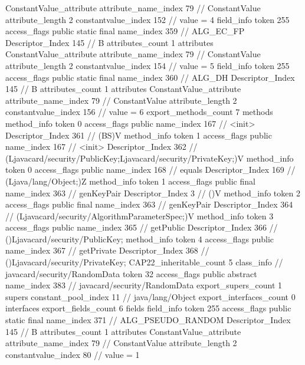 {{{{{{				ConstantValue_attribute {
					attribute_name_index	79		// ConstantValue
					attribute_length	2
					constantvalue_index	152		// value = 4
				}
				}
			}
			field_info {
				token	255
				access_flags	public static final
				name_index	359		// ALG_EC_FP
				Descriptor_Index	145		// B
				attributes_count	1
				attributes {
				ConstantValue_attribute {
					attribute_name_index	79		// ConstantValue
					attribute_length	2
					constantvalue_index	154		// value = 5
				}
				}
			}
			field_info {
				token	255
				access_flags	public static final
				name_index	360		// ALG_DH
				Descriptor_Index	145		// B
				attributes_count	1
				attributes {
				ConstantValue_attribute {
					attribute_name_index	79		// ConstantValue
					attribute_length	2
					constantvalue_index	156		// value = 6
				}
				}
			}
			}
			export_methods_count	7
			methods {
				method_info {
					token	0
					access_flags	public
					name_index	167		// <init>
					Descriptor_Index	361		// (BS)V
				}
				method_info {
					token	1
					access_flags	public
					name_index	167		// <init>
					Descriptor_Index	362		// (Ljavacard/security/PublicKey;Ljavacard/security/PrivateKey;)V
				}
				method_info {
					token	0
					access_flags	public
					name_index	168		// equals
					Descriptor_Index	169		// (Ljava/lang/Object;)Z
				}
				method_info {
					token	1
					access_flags	public final
					name_index	363		// genKeyPair
					Descriptor_Index	3		// ()V
				}
				method_info {
					token	2
					access_flags	public final
					name_index	363		// genKeyPair
					Descriptor_Index	364		// (Ljavacard/security/AlgorithmParameterSpec;)V
				}
				method_info {
					token	3
					access_flags	public
					name_index	365		// getPublic
					Descriptor_Index	366		// ()Ljavacard/security/PublicKey;
				}
				method_info {
					token	4
					access_flags	public
					name_index	367		// getPrivate
					Descriptor_Index	368		// ()Ljavacard/security/PrivateKey;
				}
			}
			CAP22_inheritable_count	5
		}
		class_info {		// javacard/security/RandomData
			token	32
			access_flags	public abstract
			name_index	383		// javacard/security/RandomData
			export_supers_count	1
			supers {
				constant_pool_index	11		// java/lang/Object
			}
			export_interfaces_count	0
			interfaces {
			}
			export_fields_count	6
			fields {
			field_info {
				token	255
				access_flags	public static final
				name_index	371		// ALG_PSEUDO_RANDOM
				Descriptor_Index	145		// B
				attributes_count	1
				attributes {
				ConstantValue_attribute {
					attribute_name_index	79		// ConstantValue
					attribute_length	2
					constantvalue_index	80		// value = 1
}}}}}}}
